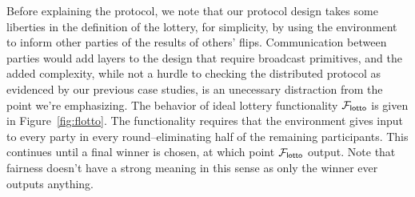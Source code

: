 Before explaining the protocol, we note that our protocol design takes some liberties in the definition of the lottery, for simplicity, by
using the environment to inform other parties of the results of others' flips.
Communication between parties would add layers to the design that require broadcast primitives, and the added complexity, while not a hurdle to checking the distributed protocol as evidenced by our previous case studies, is an unecessary distraction from the point we're emphasizing.
The behavior of ideal lottery functionality $\mathcal{F}_{{\mathsf {lotto}}}$ is given in Figure~\ref{fig:flotto}.
The functionality requires 
that the environment gives input to every party in every round--eliminating half
of the remaining participants.  This continues until a final winner is chosen, at which
point $\mathcal{F}_{{\mathsf {lotto}}}$ output. Note that fairness doesn't have a strong meaning in this sense
as only the winner ever outputs anything.
